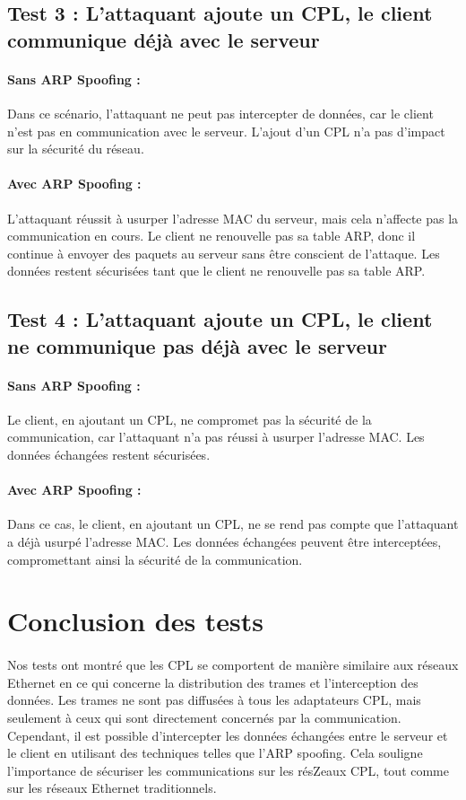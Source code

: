 \documentclass[a4paper,twocolumn]{report}
\begin{document}
\subsection{Test 3 : L'attaquant ajoute un CPL, le client communique déjà avec le serveur}
\paragraph{Sans ARP Spoofing :}
Dans ce scénario, l'attaquant ne peut pas intercepter de données,
car le client n'est pas en communication avec le serveur.
L'ajout d'un CPL n'a pas d'impact sur la sécurité du réseau.

\paragraph{Avec ARP Spoofing :}
L'attaquant réussit à usurper l'adresse MAC du serveur,
mais cela n'affecte pas la communication en cours.
Le client ne renouvelle pas sa table ARP, donc il continue à envoyer des paquets
au serveur sans être conscient de l'attaque. Les données restent sécurisées tant
que le client ne renouvelle pas sa table ARP.

\subsection{Test 4 : L'attaquant ajoute un CPL, le client ne communique pas déjà avec le serveur}
\paragraph{Sans ARP Spoofing :}
Le client, en ajoutant un CPL, ne compromet pas la sécurité de la communication,
car l'attaquant n'a pas réussi à usurper l'adresse MAC. Les données échangées restent sécurisées.

\paragraph{Avec ARP Spoofing :}
Dans ce cas, le client, en ajoutant un CPL, ne se rend pas compte que l'attaquant a déjà usurpé l'adresse MAC.
Les données échangées peuvent être interceptées, compromettant ainsi la sécurité de la communication.



\section{Conclusion des tests}
\paragraph{}Nos tests ont montré que les CPL se comportent de manière similaire
aux réseaux Ethernet en ce qui concerne la distribution des trames et l'interception des données.
Les trames ne sont pas diffusées à tous les adaptateurs CPL, mais seulement
à ceux qui sont directement concernés par la communication. Cependant,
il est possible d'intercepter les données échangées entre le serveur et le client
en utilisant des techniques telles que l'ARP spoofing. Cela souligne l'importance de
sécuriser les communications sur les résZeaux CPL, tout comme sur les réseaux Ethernet traditionnels.
\end{document}
